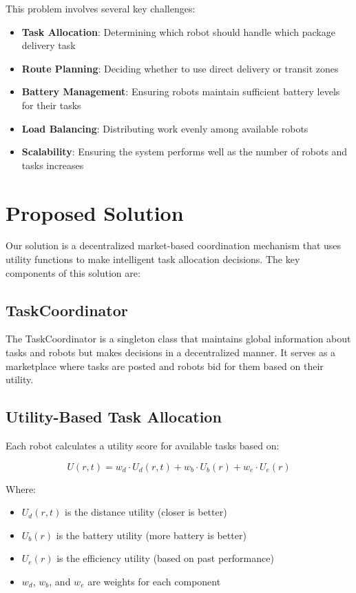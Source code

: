 \documentclass[12pt,a4paper]{article}
\begin{document}
This problem involves several key challenges:

\begin{itemize}
    \item \textbf{Task Allocation}: Determining which robot should handle which package delivery task
    \item \textbf{Route Planning}: Deciding whether to use direct delivery or transit zones
    \item \textbf{Battery Management}: Ensuring robots maintain sufficient battery levels for their tasks
    \item \textbf{Load Balancing}: Distributing work evenly among available robots
    \item \textbf{Scalability}: Ensuring the system performs well as the number of robots and tasks increases
\end{itemize}

\section{Proposed Solution}

Our solution is a decentralized market-based coordination mechanism that uses utility functions to make intelligent task allocation decisions. The key components of this solution are:

\subsection{TaskCoordinator}

The TaskCoordinator is a singleton class that maintains global information about tasks and robots but makes decisions in a decentralized manner. It serves as a marketplace where tasks are posted and robots bid for them based on their utility.

\subsection{Utility-Based Task Allocation}

Each robot calculates a utility score for available tasks based on:

\begin{equation}
U(r,t) = w_d \cdot U_d(r,t) + w_b \cdot U_b(r) + w_e \cdot U_e(r)
\end{equation}

Where:
\begin{itemize}
    \item $U_d(r,t)$ is the distance utility (closer is better)
    \item $U_b(r)$ is the battery utility (more battery is better)
    \item $U_e(r)$ is the efficiency utility (based on past performance)
    \item $w_d$, $w_b$, and $w_e$ are weights for each component
\end{itemize}
\end{document}
